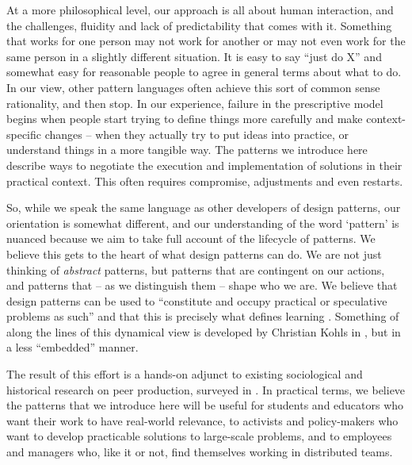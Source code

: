 At a more philosophical level, our approach is all about human interaction, and the challenges, fluidity and lack of predictability that comes with it.  Something that works for one person may not work for another or may not even work for the same person in a slightly different situation.  It is easy to say ``just do X'' and somewhat easy for reasonable people to agree in general terms about what to do.  In our view, other pattern languages often achieve this sort of common sense rationality, and then stop.  In our experience, failure in the prescriptive model begins when people start trying to define things more carefully and make context-specific changes -- when they actually try to put ideas into practice, or understand things in a more tangible way. The patterns we introduce here describe ways to negotiate the execution and implementation of solutions in their practical context.  This often requires compromise, adjustments and even restarts.  

So, while we speak the same language as other developers of design patterns, our orientation is somewhat different, and our understanding of the word `pattern' is nuanced because we aim to take full account of the lifecycle of patterns.  We believe this gets to the heart of what design patterns can do.  We are not just thinking of \emph{abstract} patterns, but patterns that are contingent on our actions, and patterns that -- as we distinguish them -- shape who we are.   We believe that design patterns can be used to ``constitute and occupy practical or speculative problems as such'' and that this is precisely what defines learning \cite[p. 204]{deleuze1994difference}.   Something of along the lines of this dynamical view
is developed by Christian Kohls in \cite{kohls2010structure,kohls2011structure}, but in a less ``embedded'' manner.

The result of this effort is a hands-on adjunct to existing sociological and historical research on peer production, surveyed in \cite{benkler2015peer}.  In practical terms, we believe the patterns that we introduce here will be useful for students and educators who want their work to have real-world relevance, to activists and policy-makers who want to develop practicable solutions to large-scale problems, and to employees and managers who, like it or not, find themselves working in distributed teams. 

